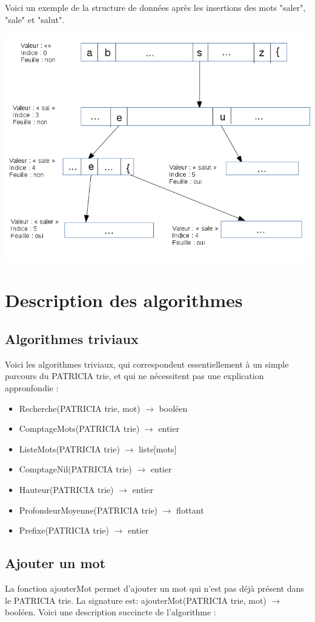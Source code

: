 \documentclass[a4paper,12pt]{report}
\begin{document}
Voici un exemple de la structure de données après les insertions des mots "saler", "sale" et "salut".

\includegraphics[scale=0.45]{../rapport/Schema PAT trie.png}


\section{Description des algorithmes}
\subsection{Algorithmes triviaux}
Voici les algorithmes triviaux, qui correspondent essentiellement à un simple parcours du PATRICIA trie, et qui ne nécessitent pas une explication appronfondie :
\begin{itemize}
 \item Recherche(PATRICIA trie, mot) $\rightarrow$ booléen
 \item ComptageMots(PATRICIA trie) $\rightarrow$ entier
 \item ListeMots(PATRICIA trie) $\rightarrow$ liste[mots]
 \item ComptageNil(PATRICIA trie) $\rightarrow$ entier
 \item Hauteur(PATRICIA trie) $\rightarrow$ entier
 \item ProfondeurMoyenne(PATRICIA trie) $\rightarrow$ flottant
 \item Prefixe(PATRICIA trie) $\rightarrow$ entier
\end{itemize}

\subsection{Ajouter un mot}
La fonction ajouterMot permet d'ajouter un mot qui n'est pas déjà présent dans le PATRICIA trie. La signature est: ajouterMot(PATRICIA trie, mot) $\rightarrow$ booléen.
Voici une description succincte de l'algorithme :
\end{document}
